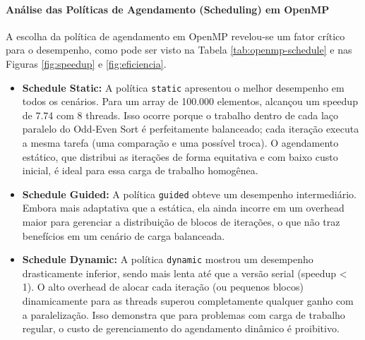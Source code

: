 \documentclass[12pt, a4paper]{article}
\begin{document}
\paragraph{Análise das Políticas de Agendamento (Scheduling) em OpenMP}
A escolha da política de agendamento em OpenMP revelou-se um fator crítico para o desempenho, como pode ser visto na Tabela \ref{tab:openmp-schedule} e nas Figuras \ref{fig:speedup} e \ref{fig:eficiencia}.
\begin{itemize}
    \item \textbf{Schedule Static:} A política \texttt{static} apresentou o melhor desempenho em todos os cenários. Para um array de 100.000 elementos, alcançou um speedup de 7.74 com 8 threads. Isso ocorre porque o trabalho dentro de cada laço paralelo do Odd-Even Sort é perfeitamente balanceado; cada iteração executa a mesma tarefa (uma comparação e uma possível troca). O agendamento estático, que distribui as iterações de forma equitativa e com baixo custo inicial, é ideal para essa carga de trabalho homogênea.
    
    \item \textbf{Schedule Guided:} A política \texttt{guided} obteve um desempenho intermediário. Embora mais adaptativa que a estática, ela ainda incorre em um overhead maior para gerenciar a distribuição de blocos de iterações, o que não traz benefícios em um cenário de carga balanceada.
    
    \item \textbf{Schedule Dynamic:} A política \texttt{dynamic} mostrou um desempenho drasticamente inferior, sendo mais lenta até que a versão serial (speedup < 1). O alto overhead de alocar cada iteração (ou pequenos blocos) dinamicamente para as threads superou completamente qualquer ganho com a paralelização. Isso demonstra que para problemas com carga de trabalho regular, o custo de gerenciamento do agendamento dinâmico é proibitivo.
\end{itemize}
\end{document}
